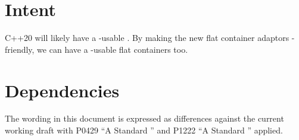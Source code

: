 \section{Intent}

C++20 will likely have a -usable .  By making
the new flat container adaptors -friendly, we can have a
-usable flat containers too.

\section{Dependencies}

The wording in this document is expressed as differences against the current
working draft with P0429 ``A Standard '' and P1222 ``A
Standard '' applied.
